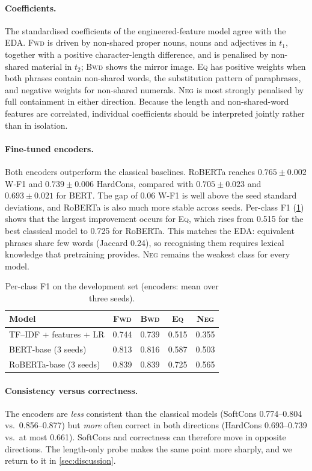 \documentclass[11pt,a4paper]{article}
\newcommand{\EQ}{\textsc{Eq}}
\newcommand{\FWD}{\textsc{Fwd}}
\newcommand{\BWD}{\textsc{Bwd}}
\newcommand{\NEG}{\textsc{Neg}}
\begin{document}
\paragraph{Coefficients.} The standardised coefficients of the engineered-feature model agree with the EDA. \FWD{} is driven by non-shared proper nouns, nouns and adjectives in $t_1$, together with a positive character-length difference, and is penalised by non-shared material in $t_2$; \BWD{} shows the mirror image. \EQ{} has positive weights when both phrases contain non-shared words, the substitution pattern of paraphrases, and negative weights for non-shared numerals. \NEG{} is most strongly penalised by full containment in either direction. Because the length and non-shared-word features are correlated, individual coefficients should be interpreted jointly rather than in isolation.

\paragraph{Fine-tuned encoders.} Both encoders outperform the classical baselines. RoBERTa reaches $0.765\pm0.002$ W-F1 and $0.739\pm0.006$ HardCons, compared with $0.705\pm0.023$ and $0.693\pm0.021$ for BERT. The gap of 0.06 W-F1 is well above the seed standard deviations, and RoBERTa is also much more stable across seeds. Per-class F1 (\cref{tab:perclass}) shows that the largest improvement occurs for \EQ{}, which rises from 0.515 for the best classical model to 0.725 for RoBERTa. This matches the EDA: equivalent phrases share few words (Jaccard 0.24), so recognising them requires lexical knowledge that pretraining provides. \NEG{} remains the weakest class for every model.

\begin{table}[t]
\centering
\small
\begin{tabular}{lcccc}
\toprule
Model & \FWD & \BWD & \EQ & \NEG \\
\midrule
TF--IDF + features + LR & 0.744 & 0.739 & 0.515 & 0.355 \\
BERT-base (3 seeds) & 0.813 & 0.816 & 0.587 & 0.503 \\
RoBERTa-base (3 seeds) & 0.839 & 0.839 & 0.725 & 0.565 \\
\bottomrule
\end{tabular}
\caption{Per-class F1 on the development set (encoders: mean over three seeds).}
\label{tab:perclass}
\end{table}

\paragraph{Consistency versus correctness.} The encoders are \emph{less} consistent than the classical models (SoftCons 0.774--0.804 vs.\ 0.856--0.877) but \emph{more} often correct in both directions (HardCons 0.693--0.739 vs.\ at most 0.661). SoftCons and correctness can therefore move in opposite directions. The length-only probe makes the same point more sharply, and we return to it in \cref{sec:discussion}.
\end{document}
